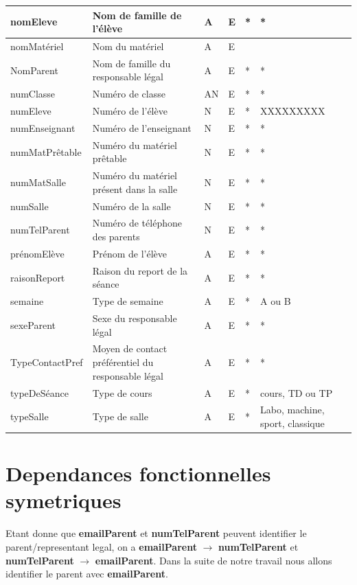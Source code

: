 \documentclass[12pt,french,titlepage]{article}
\begin{document}
	  \begin{tabular}{|p{4cm}|p{3cm}|p{1cm}|p{1cm}|p{1cm}|p{2cm}|}
	       nomEleve &	Nom de famille de l'élève &	A &	E &	* &	* \\ \hline
nomMatériel	& Nom du matériel &	A &	E & &		\\ \hline
NomParent &	Nom de famille du responsable légal &	A &	E	& * & *	\\ \hline
numClasse &	Numéro de classe &	AN &	E	& * & *	\\ \hline
numEleve &	Numéro de l'élève &	N &	E &	* &	XXXXXXXXX\\ \hline
numEnseignant &	Numéro de l'enseignant &	N &	E & * & *		\\ \hline
numMatPrêtable &	Numéro du matériel prêtable &	N &	E & * & *	\\ \hline	
numMatSalle &	Numéro du matériel présent dans la salle &	N &	E & * &	*\\ \hline	
numSalle &	Numéro de la salle &	N &	E & * & *		\\ \hline
numTelParent &	Numéro de téléphone des parents &	N &	E & * & *	\\ \hline	
prénomElève &	Prénom de l'élève &	A &	E & * & *		\\ \hline
raisonReport &	Raison du report de la séance &	A &	E & * & *	\\ \hline	
semaine &	Type de semaine &	A &	E & * & A ou B		\\ \hline
sexeParent &	Sexe du responsable légal &	A &	E & * & *	\\ \hline	
TypeContactPref &	Moyen de contact préférentiel du responsable légal &	A &	E & * & *	\\ \hline	
typeDeSéance &	Type de cours &	A &	E & *  & cours, TD ou TP		\\ \hline
typeSalle &	Type de salle &	A &	E & * & Labo, machine, sport, classique		\\ 
\hline
	  \end{tabular}
	  
	  \section{Dependances fonctionnelles symetriques}
	  
Etant donne que \textbf{emailParent }et \textbf{numTelParent }peuvent identifier le parent/representant legal, on a \textbf{emailParent }$\rightarrow$ \textbf{numTelParent }et \textbf{numTelParent }$\rightarrow$ \textbf{emailParent}. Dans la suite de notre travail nous allons identifier le parent avec \textbf{emailParent}.
	  
\end{document}
